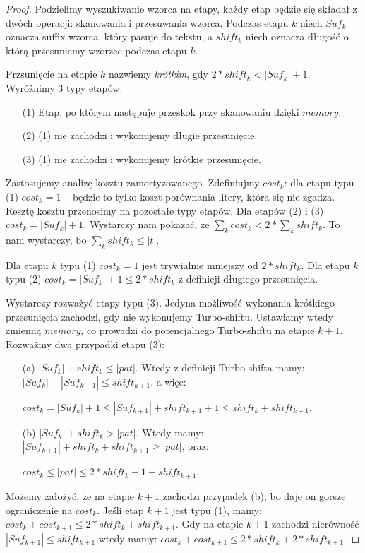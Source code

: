 \documentclass[12pt]{article}
\theoremstyle{plain}
\begin{document}
\begin{proof}
	Podzielimy wyszukiwanie wzorca na etapy, każdy etap będzie się składał z dwóch operacji: skanowania i przesuwania wzorca. Podczas etapu $k$ niech $Suf_k$ oznacza suffix wzorca, który pasuje do tekstu, a $shift_k$ niech oznacza długość o którą przesuniemy wzorzec podczas etapu $k$.

	Przsunięcie na etapie $k$ nazwiemy \emph{krótkim}, gdy $2*shift_k < |Suf_k| + 1$. Wyróżnimy 3 typy etapów:
	\begin{itemize}
		\item[(1)] Etap, po którym następuje przeskok przy skanowaniu dzięki $memory$.
		\item[(2)] (1) nie zachodzi i wykonujemy długie przesunięcie.
		\item[(3)] (1) nie zachodzi i wykonujemy krótkie przesunięcie. 
	\end{itemize}

	Zastosujemy analizę kosztu zamortyzowanego. Zdefiniujmy $cost_k$: dla etapu typu (1) $cost_k = 1$ -- będzie to tylko koszt porównania litery, która się nie zgadza. Resztę kosztu przenosimy na pozostałe typy etapów. Dla etapów (2) i (3) $cost_k = |Suf_k| + 1$. Wystarczy nam pokazać, że $\sum_k cost_k < 2* \sum_k shift_k$. To nam wystarczy, bo $\sum_k shift_k \leq |t|$.

	Dla etapu $k$ typu (1) $cost_k = 1$ jest trywialnie mniejszy od $2 * shift_k$. Dla etapu $k$ typu (2) $cost_k = |Suf_k| + 1 \leq 2 * shift_k$ z definicji długiego przesunięcia.

	Wystarczy rozważyć etapy typu (3). Jedyna możliwość wykonania krótkiego przesunięcia zachodzi, gdy nie wykonujemy Turbo-shiftu. Ustawiamy wtedy zmienną $memory$, co prowadzi do potencjalnego Turbo-shiftu na etapie $k+1$. Rozważmy dwa przypadki etapu (3):
	\begin{itemize}
		\item [(a)] $|Suf_k| + shift_k \leq |pat|$. Wtedy z definicji Turbo-shifta mamy: $|Suf_k| - |Suf_{k+1}| \leq shift_{k+1}$, a więc: \\
		\centerline{$cost_k = |Suf_{k}|+1 \leq |Suf_{k+1}| + shift_{k+1} + 1 \leq shift_k + shift_{k+1}$.}
		\item [(b)] $|Suf_k| + shift_k > |pat|$. Wtedy mamy: $|Suf_{k+1}| + shift_k + shift_{k+1} \geq |pat|$, oraz: \\
		\centerline{$cost_k \leq |pat| \leq 2 * shift_k -1 + shift_{k+1}$.}
	\end{itemize}

	Możemy założyć, że na etapie $k+1$ zachodzi przypadek (b), bo daje on gorsze ograniczenie na $cost_k$. Jeśli etap $k+1$ jest typu (1), mamy: $cost_k + cost_{k+1} \leq 2 * shift_k + shift_{k+1}$. Gdy na etapie $k+1$ zachodzi nierówność $|Suf_{k+1}| \leq shift_{k+1}$ wtedy mamy: $cost_k + cost_{k+1} \leq 2 * shift_k + 2* shift_{k+1}$.


\end{proof}
\end{document}
